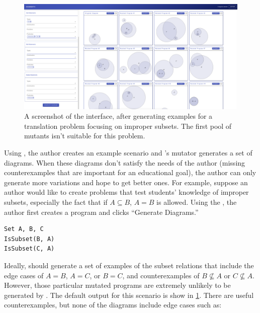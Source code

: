 \begin{figure}
    \centering
    \includegraphics[width=\linewidth]{assets/appendix/edgeworth-bad-output.pdf}
    \caption{A screenshot of the \Edgeworth interface, after generating examples for a translation problem focusing on improper subsets. The first pool of mutants isn't suitable for this problem.}
    \label{fig:edgeworth-bad-output}
\end{figure}

Using \Edgeworth, the author creates an example scenario and \Edgeworth's mutator generates a set of diagrams. When these diagrams don't satisfy the needs of the author (\eg missing counterexamples that are important for an educational goal), the author can only generate more variations and hope to get better ones. For example, suppose an author would like to create problems that test students' knowledge of improper subsets, especially the fact that if $A \subseteq B$, $A = B$ is allowed. Using the \Edgeworth, the author first creates a \Substance program and clicks ``Generate Diagrams.'' 

\noindent\hspace*{\fill}
\begin{minipage}[c]{0.23\columnwidth}
\begin{mdframed}[style=SUBCode]
\begin{lstlisting}[language=Sub-SET,escapechar=@,numbers=none]
Set A, B, C
IsSubset(B, A)
IsSubset(C, A)
\end{lstlisting}
\end{mdframed}
\end{minipage}
\hspace*{\fill}

Ideally, \Edgeworth should generate a set of examples of the subset relations that include the edge cases of $A = B$, $A = C$, or $B = C$, and counterexamples of $B \not\subseteq A$ or $C \not\subseteq A$. However, those particular mutated programs are extremely unlikely to be generated by \Edgeworth. The default \Edgeworth output for this scenario is show in  \cref{fig:edgeworth-bad-output}. There are useful counterexamples, but none of the diagrams include edge cases such as:

